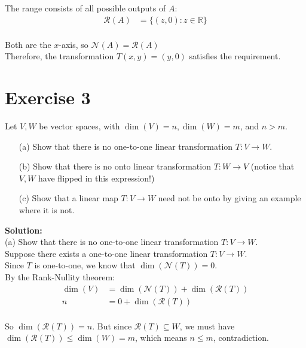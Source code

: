 \documentclass{article}
\begin{document}
The range consists of all possible outputs of $A$:
\begin{align*}
\mathcal{R}(A) &= \{(z,0) : z \in \mathbb{R}\}\\
\end{align*}

Both are the $x$-axis, so $\mathcal{N}(A) = \mathcal{R}(A)$ \\

Therefore, the transformation $T(x,y) = (y,0)$ satisfies the requirement.

\newpage

\section*{Exercise 3}
Let $V,W$ be vector spaces, with $\dim(V) = n, \dim(W) = m$, and $n > m$.

\begin{itemize}
    \item[(a)] Show that there is no one-to-one linear transformation $T : V \to W$.

    \item[(b)] Show that there is no onto linear transformation $T : W \to V$ (notice that $V,W$ have flipped in this expression!)

    \item[(c)] Show that a linear map $T : V \to W$ need not be onto by giving an example where it is not.
\end{itemize}

\textbf{Solution: }\\

(a) Show that there is no one-to-one linear transformation $T : V \to W$. \\

Suppose there exists a one-to-one linear transformation $T : V \to W$. \\

Since $T$ is one-to-one, we know that $\dim(\mathcal{N}(T)) = 0$. \\

By the Rank-Nullity theorem:
\begin{align*}
\dim(V) &= \dim(\mathcal{N}(T)) + \dim(\mathcal{R}(T))\\
n &= 0 + \dim(\mathcal{R}(T))\\
\end{align*}

So $\dim(\mathcal{R}(T)) = n$. But since $\mathcal{R}(T) \subseteq W$, we must have $\dim(\mathcal{R}(T)) \leq \dim(W) = m$, which means $n \leq m$, contradiction. \\
\end{document}
